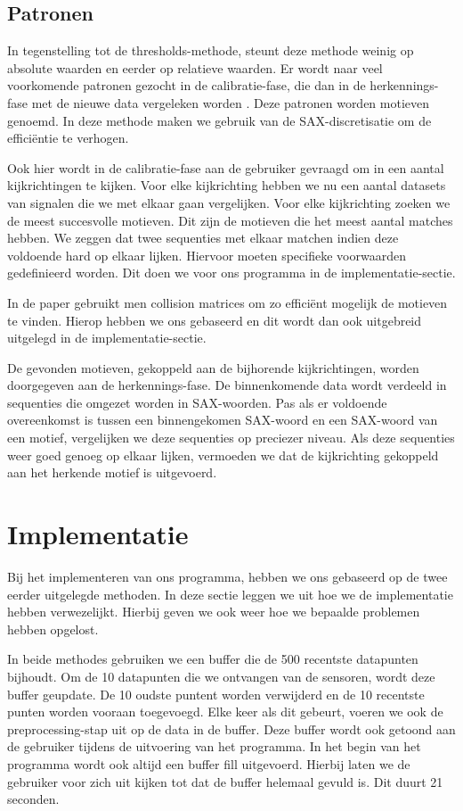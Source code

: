 \documentclass{article}
\begin{document}
\subsection{Patronen}

In tegenstelling tot de thresholds-methode, steunt deze methode weinig op absolute waarden en eerder op relatieve waarden. Er wordt naar veel voorkomende patronen gezocht in de calibratie-fase, die dan in de herkennings-fase met de nieuwe data vergeleken worden \cite{motifs}. Deze patronen worden motieven genoemd. In deze methode maken we gebruik van de SAX-discretisatie om de efficiëntie te verhogen.

Ook hier wordt in de calibratie-fase aan de gebruiker gevraagd om in een aantal kijkrichtingen te kijken. Voor elke kijkrichting hebben we nu een aantal datasets van signalen die we met elkaar gaan vergelijken. Voor elke kijkrichting zoeken we de meest succesvolle motieven. Dit zijn de motieven die het meest aantal matches hebben. We zeggen dat twee sequenties met elkaar matchen indien deze voldoende hard op elkaar lijken. Hiervoor moeten specifieke voorwaarden gedefinieerd worden. Dit doen we voor ons programma in de implementatie-sectie.

In de paper \cite{motifs} gebruikt men collision matrices om zo efficiënt mogelijk de motieven te vinden. Hierop hebben we ons gebaseerd en dit wordt dan ook uitgebreid uitgelegd in de implementatie-sectie.

De gevonden motieven, gekoppeld aan de bijhorende kijkrichtingen, worden doorgegeven aan de herkennings-fase. De binnenkomende data wordt verdeeld in sequenties die omgezet worden in SAX-woorden. Pas als er voldoende overeenkomst is tussen een binnengekomen SAX-woord en een SAX-woord van een motief, vergelijken we deze sequenties op preciezer niveau. Als deze sequenties weer goed genoeg op elkaar lijken, vermoeden we dat de kijkrichting gekoppeld aan het herkende motief is uitgevoerd.

\section{Implementatie}

Bij het implementeren van ons programma, hebben we ons gebaseerd op de twee eerder uitgelegde methoden. In deze sectie leggen we uit hoe we de implementatie hebben verwezelijkt. Hierbij geven we ook weer hoe we bepaalde problemen hebben opgelost.

In beide methodes gebruiken we een buffer die de 500 recentste datapunten bijhoudt. Om de 10 datapunten die we ontvangen van de sensoren, wordt deze buffer geupdate. De 10 oudste puntent worden verwijderd en de 10 recentste punten worden vooraan toegevoegd. Elke keer als dit gebeurt, voeren we ook de preprocessing-stap uit op de data in de buffer. Deze buffer wordt ook getoond aan de gebruiker tijdens de uitvoering van het programma. In het begin van het programma wordt ook altijd een buffer fill uitgevoerd. Hierbij laten we de gebruiker voor zich uit kijken tot dat de buffer helemaal gevuld is. Dit duurt 21 seconden.
\end{document}
